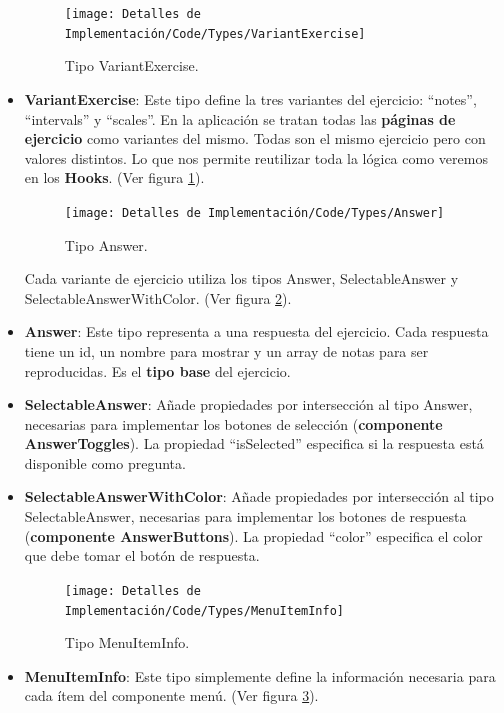 \documentclass[12pt,twoside,titlepage]{report}
\begin{document}
\begin{itemize}
    \begin{figure}[H]
        \centering
        \texttt{[image: Detalles de Implementación/Code/Types/VariantExercise]}
        \caption{Tipo VariantExercise.}
        \label{fig:VariantExercise}
    \end{figure}

    \item \textbf{VariantExercise}: Este tipo define la tres variantes del ejercicio: ``notes'', ``intervals'' y ``scales''. En la aplicación se tratan todas las \textbf{páginas de ejercicio} como variantes del mismo. Todas son el mismo ejercicio pero con valores distintos. Lo que nos permite reutilizar toda la lógica como veremos en los \textbf{Hooks}.
    (Ver figura \ref{fig:VariantExercise}).

    \begin{figure}[H]
        \centering
        \texttt{[image: Detalles de Implementación/Code/Types/Answer]}
        \caption{Tipo Answer.}
        \label{fig:Answer}
    \end{figure}

    Cada variante de ejercicio utiliza los tipos Answer, SelectableAnswer y SelectableAnswerWithColor. (Ver figura \ref{fig:Answer}).

    \item \textbf{Answer}: Este tipo representa a una respuesta del ejercicio. Cada respuesta tiene un id, un nombre para mostrar y un array de notas para ser reproducidas. Es el \textbf{tipo base} del ejercicio.
    \item \textbf{SelectableAnswer}: Añade propiedades por intersección al tipo Answer, necesarias para implementar los botones de selección (\textbf{componente AnswerToggles}). La propiedad ``isSelected'' especifica si la respuesta está disponible como pregunta.
    \item \textbf{SelectableAnswerWithColor}: Añade propiedades por intersección al tipo SelectableAnswer, necesarias para implementar los botones de respuesta (\textbf{componente AnswerButtons}). La propiedad ``color'' especifica el color que debe tomar el botón de respuesta.

    \begin{figure}[H]
        \centering
        \texttt{[image: Detalles de Implementación/Code/Types/MenuItemInfo]}
        \caption{Tipo MenuItemInfo.}
        \label{fig:MenuItemInfo}
    \end{figure}

    \item \textbf{MenuItemInfo}: Este tipo simplemente define la información necesaria para cada ítem del componente menú. (Ver figura \ref{fig:MenuItemInfo}).
\end{itemize}
\end{document}
